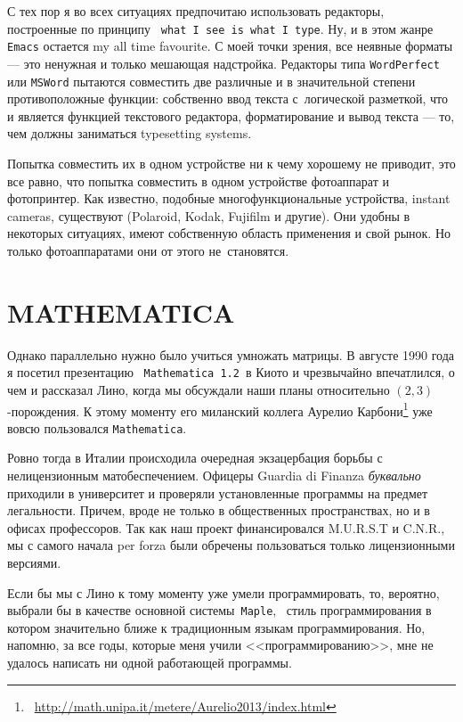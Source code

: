 \documentclass[intlimits,twoside,a4paper,11pt]{article}
\begin{document}
	
	С тех пор я во всех ситуациях предпочитаю использовать редакторы, построенные 
	по принципу \, {\tt what~I~see~is~what~I~type}. Ну, и в этом жанре 
	{\tt Emacs} остается my all time favourite. С моей точки зрения, 
	все неявные форматы --- это ненужная и только мешающая надстройка. 
	Редакторы типа {\tt WordPerfect} или {\tt MSWord} пытаются совместить две
	различные и в значительной степени противоположные функции:
	собственно ввод текста с~логической разметкой, что и является функцией 
	текстового редактора, форматирование и вывод текста --- то, чем должны 
	заниматься typesetting systems. 
	\par
	Попытка совместить их в одном устройстве ни к чему хорошему не приводит,
	это все равно, что попытка совместить в одном устройстве фотоаппарат и 
	фотопринтер. Как известно, подобные многофункциональные устройства, 
	instant cameras, существуют (Polaroid, Kodak, Fujifilm и другие). Они удобны 
	в некоторых ситуациях, имеют собственную область применения и свой 
	рынок. Но только фотоаппаратами они от этого не~ста\-новятся. 
	
	
	\section{MATHEMATICA}
	
	Однако параллельно нужно было учиться умножать матрицы. В августе 
	1990 года я посетил презентацию \, {\tt Mathematica 1.2} \,в Киото и
	чрезвычайно впечатлился, о чем и рассказал Лино, когда мы обсуждали
	наши планы относительно $(2,3)$-порождения. К этому моменту
	его миланский коллега Аурелио 
	Карбони\footnote{~\url{http://math.unipa.it/metere/Aurelio2013/index.html}}
	уже вовсю пользовался {\tt Mathematica}. 
	
	Ровно тогда в Италии
	происходила очередная экзацербация борьбы с нелицензионным 
	матобеспечением. Офицеры Guardia di Finanza {\it буквально\/}
	приходили в университет и проверяли установленные программы 
	на предмет легальности. Причем, вроде не только в общественных
	пространствах, но и в офисах профессоров. Так как наш проект
	финансировался M.U.R.S.T и C.N.R., мы с самого начала per forza
	были обречены пользоваться только лицензионными версиями.
	
	Если бы мы с Лино к тому моменту уже умели программировать,
	то, вероятно, выбрали бы в качестве основной системы \,{\tt Maple}, \,
	стиль программирования в котором значительно ближе к
	традиционным языкам программирования. Но, напомню, за все годы,
	которые меня учили <<программированию>>, мне не удалось написать
	ни одной работающей программы. 
	
\end{document}
